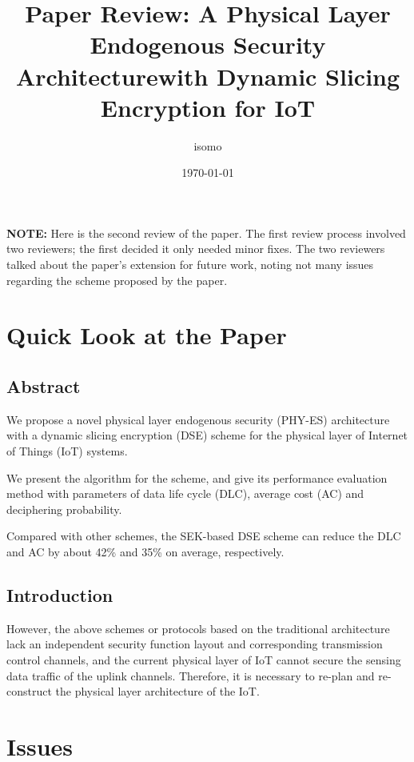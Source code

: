 \documentclass[a4paper]{article}
\title{Paper Review: A Physical Layer Endogenous Security Architecturewith Dynamic Slicing Encryption for IoT}
\author{isomo}
\date{\today}
\begin{document}
\maketitle

\textbf{NOTE:} Here is the second review of the paper. The first review process involved two reviewers; the first decided it only needed minor fixes. The two reviewers talked about the paper's extension for future work, noting not many issues regarding the scheme proposed by the paper.

\section{Quick Look at the Paper}
\subsection{Abstract}

We propose a novel physical layer endogenous security (PHY-ES) architecture with a dynamic slicing encryption (DSE) scheme for the physical layer of Internet of Things (IoT) systems.

We present the algorithm for the scheme, and give its performance evaluation method with parameters of data life cycle (DLC), average cost (AC) and deciphering probability.

Compared with other schemes, the SEK-based DSE scheme can reduce the DLC and AC by about 42\% and 35\% on average, respectively.

\subsection{Introduction}

However, the above schemes or protocols based on the traditional architecture lack an independent security function layout and corresponding transmission control channels, and the current physical layer of IoT cannot secure the sensing data traffic of the uplink channels. Therefore, it is necessary to re-plan and re-construct the physical layer architecture of the IoT.

\section{Issues}
\end{document}
